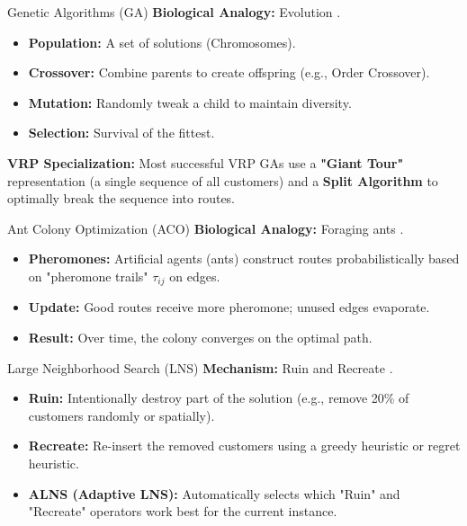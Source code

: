 \documentclass{beamer}
\begin{document}
\begin{frame}{Genetic Algorithms (GA)}
    \textbf{Biological Analogy:} Evolution \cite{jasim2024guided}.
    \begin{itemize}
        \item \textbf{Population:} A set of solutions (Chromosomes).
        \item \textbf{Crossover:} Combine parents to create offspring (e.g., Order Crossover).
        \item \textbf{Mutation:} Randomly tweak a child to maintain diversity.
        \item \textbf{Selection:} Survival of the fittest.
    \end{itemize}
    \textbf{VRP Specialization:}
    Most successful VRP GAs use a \textbf{"Giant Tour"} representation (a single sequence of all customers) and a \textbf{Split Algorithm} to optimally break the sequence into routes.
\end{frame}

\begin{frame}{Ant Colony Optimization (ACO)}
    \textbf{Biological Analogy:} Foraging ants \cite{stodola2014aco}.
    \begin{itemize}
        \item \textbf{Pheromones:} Artificial agents (ants) construct routes probabilistically based on "pheromone trails" $\tau_{ij}$ on edges.
        \item \textbf{Update:} Good routes receive more pheromone; unused edges evaporate.
        \item \textbf{Result:} Over time, the colony converges on the optimal path.
    \end{itemize}
\end{frame}

\begin{frame}{Large Neighborhood Search (LNS)}
    \textbf{Mechanism:} Ruin and Recreate \cite{gu2019adaptive}.
    \begin{itemize}
        \item \textbf{Ruin:} Intentionally destroy part of the solution (e.g., remove 20\% of customers randomly or spatially).
        \item \textbf{Recreate:} Re-insert the removed customers using a greedy heuristic or regret heuristic.
        \item \textbf{ALNS (Adaptive LNS):} Automatically selects which "Ruin" and "Recreate" operators work best for the current instance.
    \end{itemize}
\end{frame}
\end{document}
